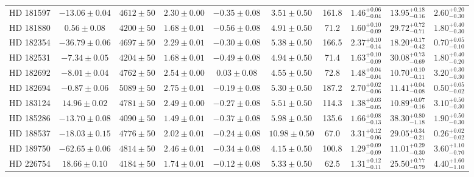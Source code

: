 \begin{table*}
\begin{tabular}{cccccccccc}
HD 181597 & $-13.06 \pm 0.04$ & $4612 \pm 50$ & $2.30 \pm 0.00$ & $-0.35 \pm 0.08$ & $3.51 \pm 0.50$ & 161.8 & $1.46^{+0.06}_{-0.04}$ & $13.95^{+0.18}_{-0.16}$ & $2.60^{+0.20}_{-0.30}$ \\
HD 181880 & $0.56 \pm 0.08$ & $4200 \pm 50$ & $1.68 \pm 0.01$ & $-0.56 \pm 0.08$ & $4.91 \pm 0.50$ & 71.2 & $1.60^{+0.10}_{-0.09}$ & $29.72^{+0.72}_{-0.71}$ & $1.80^{+0.40}_{-0.30}$ \\
HD 182354 & $-36.79 \pm 0.06$ & $4697 \pm 50$ & $2.29 \pm 0.01$ & $-0.30 \pm 0.08$ & $5.38 \pm 0.50$ & 166.5 & $2.37^{+0.10}_{-0.14}$ & $18.20^{+0.17}_{-0.42}$ & $0.70^{+0.05}_{-0.10}$ \\
HD 182531 & $-7.34 \pm 0.05$ & $4204 \pm 50$ & $1.68 \pm 0.01$ & $-0.49 \pm 0.08$ & $4.94 \pm 0.50$ & 71.4 & $1.63^{+0.10}_{-0.09}$ & $30.08^{+0.73}_{-0.69}$ & $1.80^{+0.40}_{-0.20}$ \\
HD 182692 & $-8.01 \pm 0.04$ & $4762 \pm 50$ & $2.54 \pm 0.00$ & $0.03 \pm 0.08$ & $4.55 \pm 0.50$ & 72.8 & $1.48^{+0.04}_{-0.04}$ & $10.70^{+0.10}_{-0.11}$ & $3.20^{+0.30}_{-0.30}$ \\
HD 182694 & $-0.87 \pm 0.06$ & $5089 \pm 50$ & $2.75 \pm 0.01$ & $-0.19 \pm 0.08$ & $5.30 \pm 0.50$ & 187.2 & $2.70^{+0.02}_{-0.06}$ & $11.41^{+0.04}_{-0.08}$ & $0.50^{+0.05}_{-0.02}$ \\
HD 183124 & $14.96 \pm 0.02$ & $4781 \pm 50$ & $2.49 \pm 0.00$ & $-0.27 \pm 0.08$ & $5.51 \pm 0.50$ & 114.3 & $1.38^{+0.03}_{-0.05}$ & $10.89^{+0.07}_{-0.16}$ & $3.10^{+0.50}_{-0.30}$ \\
HD 185286 & $-13.70 \pm 0.08$ & $4090 \pm 50$ & $1.49 \pm 0.01$ & $-0.37 \pm 0.08$ & $5.98 \pm 0.50$ & 135.6 & $1.66^{+0.08}_{-0.13}$ & $38.30^{+0.80}_{-1.18}$ & $1.90^{+0.50}_{-0.30}$ \\
HD 188537 & $-18.03 \pm 0.15$ & $4776 \pm 50$ & $2.02 \pm 0.01$ & $-0.24 \pm 0.08$ & $10.98 \pm 0.50$ & 67.0 & $3.31^{+0.12}_{-0.06}$ & $29.05^{+0.34}_{-0.21}$ & $0.26^{+0.02}_{-0.02}$ \\
HD 189750 & $-62.65 \pm 0.06$ & $4814 \pm 50$ & $2.46 \pm 0.01$ & $-0.34 \pm 0.08$ & $4.15 \pm 0.50$ & 100.8 & $1.29^{+0.09}_{-0.09}$ & $11.01^{+0.29}_{-0.30}$ & $3.60^{+1.10}_{-0.70}$ \\
HD 226754 & $18.66 \pm 0.10$ & $4184 \pm 50$ & $1.74 \pm 0.01$ & $-0.12 \pm 0.08$ & $5.33 \pm 0.50$ & 62.5 & $1.31^{+0.12}_{-0.11}$ & $25.50^{+0.77}_{-0.79}$ & $4.40^{+1.60}_{-1.10}$ \\
\hline
\end{tabular}
\end{table*}
